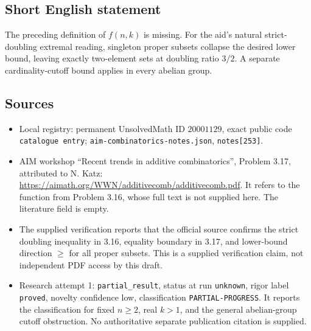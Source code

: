 \documentclass[11pt]{article}
\begin{document}
\subsection{Short English statement}
The preceding definition of \(f(n,k)\) is missing. For the aid's natural strict-doubling extremal reading, singleton proper subsets collapse the desired lower bound, leaving exactly two-element sets at doubling ratio \(3/2\). A separate cardinality-cutoff bound applies in every abelian group.
\subsection{Sources}
\begin{itemize}
\item Local registry: permanent UnsolvedMath ID \(20001129\), exact public code \texttt{catalogue entry}; \texttt{aim-combinatorics-notes.json}, \texttt{notes[253]}.
\item AIM workshop ``Recent trends in additive combinatorics'', Problem 3.17, attributed to N. Katz: \url{https://aimath.org/WWN/additivecomb/additivecomb.pdf}. It refers to the function from Problem 3.16, whose full text is not supplied here. The literature field is empty.
\item The supplied verification reports that the official source confirms the strict doubling inequality in 3.16, equality boundary in 3.17, and lower-bound direction \(\geq\) for all proper subsets. This is a supplied verification claim, not independent PDF access by this draft.
\item Research attempt 1: \texttt{partial\_result}, status at run \texttt{unknown}, rigor label \texttt{proved}, novelty confidence low, classification \texttt{PARTIAL-PROGRESS}. It reports the classification for fixed \(n\geq2\), real \(k>1\), and the general abelian-group cutoff obstruction. No authoritative separate publication citation is supplied.
\end{itemize}
\end{document}
